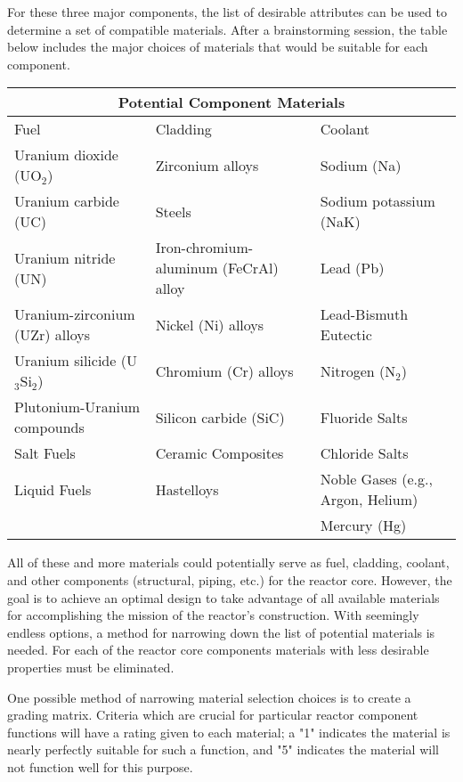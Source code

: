 \documentclass[]{report}
\begin{document}
For these three major components, the list of desirable attributes can be used to determine a set of compatible materials.  After a brainstorming session, the table below includes the major choices of materials that would be suitable for each component.

\begin{center}
\begin{tabular}[c]{| p{2.0cm} | p{2.5cm} | p{2.5cm} |}
\hline
\multicolumn{3}{|c|}{Potential Component Materials} \\
\hline
Fuel & Cladding & Coolant \\
\hline
Uranium dioxide (UO$_2$) & Zirconium alloys & Sodium (Na) \\
\hline
Uranium carbide (UC) & Steels & Sodium potassium (NaK) \\
\hline
Uranium nitride (UN) & Iron-chromium-aluminum (FeCrAl) alloy & Lead (Pb) \\
\hline
Uranium-zirconium (UZr) alloys & Nickel (Ni) alloys & Lead-Bismuth Eutectic\\
\hline
Uranium silicide (U$_3$Si$_2$)  & Chromium (Cr) alloys & Nitrogen (N$_2$)\\ %
\hline
Plutonium-Uranium compounds  & Silicon carbide (SiC) & Fluoride Salts \\
\hline
Salt Fuels & Ceramic Composites & Chloride Salts \\
\hline
Liquid Fuels & Hastelloys & Noble Gases (e.g., Argon, Helium) \\
\hline
 & & Mercury (Hg)  \\
\hline
\end{tabular}
\end{center}

All of these and more materials could potentially serve as fuel, cladding, coolant, and other components (structural, piping, etc.) for the reactor core.  However, the goal is to achieve an optimal design to take advantage of all available materials for accomplishing the mission of the reactor's construction.  With seemingly endless options, a method for narrowing down the list of potential materials is needed. For each of the reactor core components materials with less desirable properties must be eliminated.  

One possible method of narrowing material selection choices is to create a grading matrix.  Criteria which are crucial for particular reactor component functions will have a rating given to each material; a "1" indicates the material is nearly perfectly suitable for such a function, and "5" indicates the material will not function well for this purpose.
\end{document}
